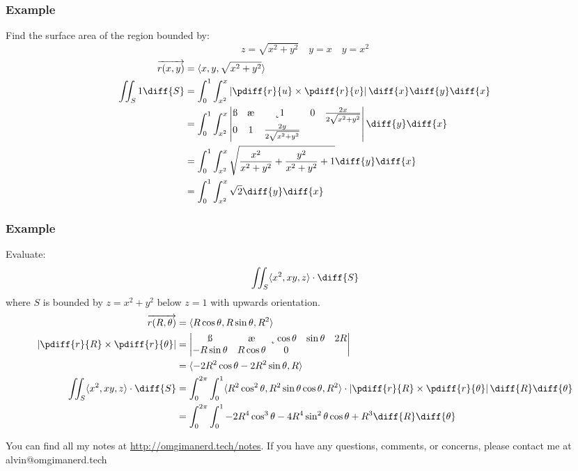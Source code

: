 \documentclass{math}
\begin{document}
\subsubsection*{Example}
Find the surface area of the region bounded by:
\[ z = \sqrt{x^2+y^2} \quad y = x \quad y = x^2 \]
\begin{align*}
  \overrightarrow{r(x,y)} &= \langle x,y,\sqrt{x^2+y^2}\rangle \\
  \iint_{S}1\diff{S} &= \int_{0}^{1}\int_{x^2}^{x}
    \left|\pdiff{r}{u}\times\pdiff{r}{v}\right|\diff{x}\diff{y}\diff{x} \\
  &= \int_{0}^{1}\int_{x^2}^{x}\begin{vmatrix}
    \i & \j & \k \\
    1 & 0 & \frac{2x}{2\sqrt{x^2+y^2}} \\
    0 & 1 & \frac{2y}{2\sqrt{x^2+y^2}}
  \end{vmatrix}\diff{y}\diff{x} \\
  &= \int_{0}^{1}\int_{x^2}^{x}
    \sqrt{\frac{x^2}{x^2+y^2}+\frac{y^2}{x^2+y^2}+1}\diff{y}\diff{x} \\
  &= \int_{0}^{1}\int_{x^2}^{x}\sqrt{2}\diff{y}\diff{x}
\end{align*}

\subsubsection*{Example}
Evaluate:
\[ \iint_{S}\langle x^2,xy,z\rangle\cdot\diff{S} \]
where \( S \) is bounded by \( z = x^2+y^2 \) below \( z = 1 \) with upwards
orientation.
\begin{align*}
  \overrightarrow{r(R,\theta)} &= \langle R\cos\theta,R\sin\theta,R^2\rangle \\
  \left|\pdiff{r}{R}\times\pdiff{r}{\theta}\right| &= \begin{vmatrix}
    \i & \j & \k \\
    \cos\theta & \sin\theta & 2R \\
    -R\sin\theta & R\cos\theta & 0
  \end{vmatrix} \\
  &= \langle-2R^2\cos\theta-2R^2\sin\theta,R\rangle \\
  \iint_{S}\langle x^2,xy,z\rangle\cdot\diff{S} &=
    \int_{0}^{2\pi}\int_{0}^{1}\langle R^2\cos^2\theta,R^2\sin\theta\cos\theta,
    R^2\rangle\cdot\left|\pdiff{r}{R}\times\pdiff{r}{\theta}\right|
    \diff{R}\diff{\theta} \\
  &= \int_{0}^{2\pi}\int_{0}^{1}-2R^4\cos^3\theta-4R^4\sin^2\theta\cos\theta+
    R^3\diff{R}\diff{\theta}
\end{align*}

\begin{center}
  You can find all my notes at \url{http://omgimanerd.tech/notes}. If you have
  any questions, comments, or concerns, please contact me at
  alvin@omgimanerd.tech
\end{center}
\end{document}

